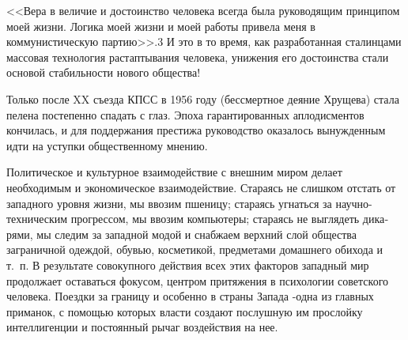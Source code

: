 \documentclass{book}
\begin{document}
{<<Вера в величие и достоинство человека всегда была руководящим принципом моей жизни. Логика моей жизни и моей работы привела меня в коммунистическую партию>>.3 И это в то время, как разработанная сталинцами массовая технология растаптывания человека, унижения его достоинства стали основой стабильности нового общества!

Только после XX съезда КПСС в 1956 году (бессмертное деяние Хрущева) стала пелена постепенно спадать с глаз. Эпо­ха гарантированных аплодисментов кончилась, и для поддер­жания престижа руководство оказалось вынужденным идти на уступки общественному мнению.

Политическое и культурное взаимодействие с внешним ми­ром делает необходимым и экономическое взаимодействие. Стараясь не слишком отстать от западного уровня жизни, мы ввозим пшеницу; стараясь угнаться за научно-техническим про­грессом, мы ввозим компьютеры; стараясь не выглядеть дика­рями, мы следим за западной модой и снабжаем верхний слой общества заграничной одеждой, обувью, косметикой, предме­тами домашнего обихода и т.~п. В результате совокупного действия всех этих факторов западный мир продолжает оста­ваться фокусом, центром притяжения в психологии советско­го человека. Поездки за границу и особенно в страны Запада -одна из главных приманок, с помощью которых власти со­здают послушную им прослойку интеллигенции и постоянный рычаг воздействия на нее.

}
\end{document}
